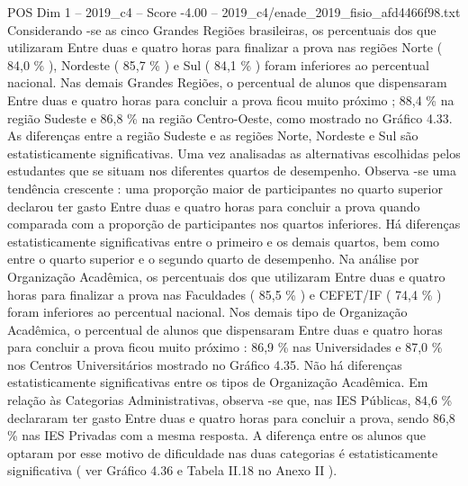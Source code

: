 \begin{textsample}{POS Dim 1 – 2019\_c4 – Score -4.00 – 2019\_c4/enade\_2019\_fisio\_afd4466f98.txt}
Considerando -se as cinco Grandes Regiões brasileiras, os percentuais dos que utilizaram Entre duas e quatro horas para finalizar a prova nas regiões Norte ( 84,0 \% ), Nordeste ( 85,7 \% ) e Sul ( 84,1 \% ) foram inferiores ao percentual nacional.
Nas demais Grandes Regiões, o percentual de alunos que dispensaram Entre duas e quatro horas para concluir a prova ficou muito próximo ; 88,4 \% na região Sudeste e 86,8 \% na região Centro-Oeste, como mostrado no Gráfico 4.33.
As diferenças entre a região Sudeste e as regiões Norte, Nordeste e Sul são estatisticamente significativas.
Uma vez analisadas as alternativas escolhidas pelos estudantes que se situam nos diferentes quartos de desempenho.
Observa -se uma tendência crescente : uma proporção maior de participantes no quarto superior declarou ter gasto Entre duas e quatro horas para concluir a prova quando comparada com a proporção de participantes nos quartos inferiores.
Há diferenças estatisticamente significativas entre o primeiro e os demais quartos, bem como entre o quarto superior e o segundo quarto de desempenho.
Na análise por Organização Acadêmica, os percentuais dos que utilizaram Entre duas e quatro horas para finalizar a prova nas Faculdades ( 85,5 \% ) e CEFET/IF ( 74,4 \% ) foram inferiores ao percentual nacional.
Nos demais tipo de Organização Acadêmica, o percentual de alunos que dispensaram Entre duas e quatro horas para concluir a prova ficou muito próximo : 86,9 \% nas Universidades e 87,0 \% nos Centros Universitários mostrado no Gráfico 4.35.
Não há diferenças estatisticamente significativas entre os tipos de Organização Acadêmica.
Em relação às Categorias Administrativas, observa -se que, nas IES Públicas, 84,6 \% declararam ter gasto Entre duas e quatro horas para concluir a prova, sendo 86,8 \% nas IES Privadas com a mesma resposta.
A diferença entre os alunos que optaram por esse motivo de dificuldade nas duas categorias é estatisticamente significativa ( ver Gráfico 4.36 e Tabela II.18 no Anexo II ).

\end{textsample}
